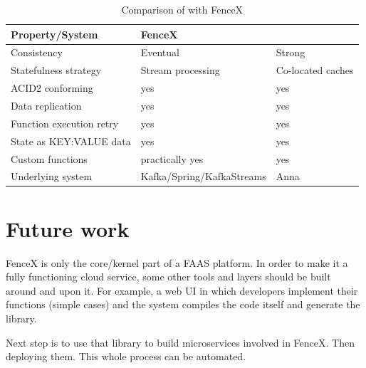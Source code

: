 \documentclass[a4]{report}
\begin{document}
    \begin{table}[h!]
        \begin{tabular}{ |l|l|l| }
            \hline
            Property/System          & FenceX                    & \cite{Functions-as-a-Service-2020} \\
            \hline
            Consistency              & Eventual                  & Strong                             \\
            Statefulness strategy    & Stream processing         & Co-located caches                  \\
            ACID2 conforming         & yes                       & yes                                \\
            Data replication         & yes                       & yes                                \\
            Function execution retry & yes                       & yes                                \\
            State as KEY:VALUE data  & yes                       & yes                                \\
            Custom functions         & practically yes           & yes                                \\
            Underlying system        & Kafka/Spring/KafkaStreams & Anna                               \\
            \hline
        \end{tabular}
        \caption{Comparison of  \cite{Functions-as-a-Service-2020} with FenceX}
        \label{table:fencex-comp}
    \end{table}


    \section{Future work}
    FenceX is only the core/kernel part of a FAAS platform.
    In order to make it a fully functioning cloud service, some other tools and layers should be built around and
    upon it.
    For example, a web UI in which developers implement their functions (simple cases) and the system compiles
    the code itself and generate the library.

    Next step is to use that library to build microservices involved in FenceX.
    Then deploying them.
    This whole process can be automated.

    \nocite{*}
    
    
\end{document}
